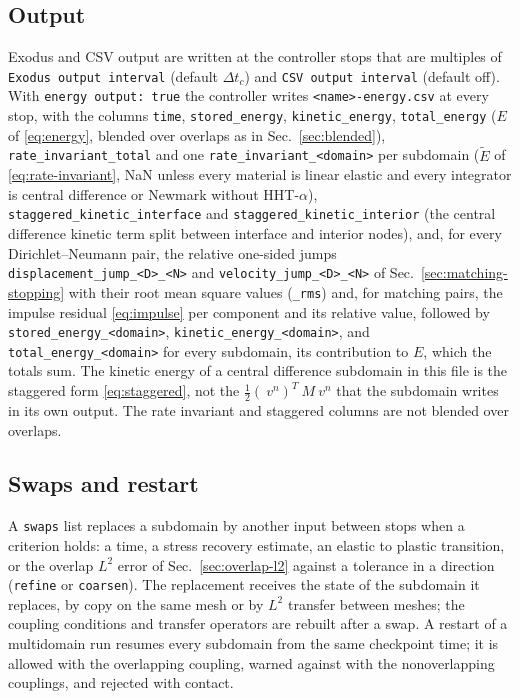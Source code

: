 \documentclass[11pt]{article}
\newcommand{\code}[1]{\texttt{#1}}
\begin{document}
\subsection{Output}
\label{sec:output}

Exodus and CSV output are written at the controller stops that are
multiples of \code{Exodus output interval} (default $\Delta t_c$) and
\code{CSV output interval} (default off). With
\code{energy output: true} the controller writes
\code{<name>-energy.csv} at every stop, with the columns \code{time},
\code{stored\_energy}, \code{kinetic\_energy}, \code{total\_energy}
($E$ of \eqref{eq:energy}, blended over overlaps as in
Sec.~\ref{sec:blended}), \code{rate\_invariant\_total} and one
\code{rate\_invariant\_<domain>} per subdomain ($\tilde{E}$ of
\eqref{eq:rate-invariant}, NaN unless every material is linear elastic and
every integrator is central difference or Newmark without HHT-$\alpha$),
\code{staggered\_kinetic\_interface} and
\code{staggered\_kinetic\_interior} (the central difference kinetic term
split between interface and interior nodes), and, for every
Dirichlet--Neumann pair, the relative one-sided jumps
\code{displacement\_jump\_<D>\_<N>} and \code{velocity\_jump\_<D>\_<N>}
of Sec.~\ref{sec:matching-stopping} with their root mean square values
(\code{\_rms}) and, for matching pairs, the impulse residual
\eqref{eq:impulse} per component and its relative value, followed by
\code{stored\_energy\_<domain>}, \code{kinetic\_energy\_<domain>},
and \code{total\_energy\_<domain>} for every subdomain, its contribution
to $E$, which the totals sum. The kinetic energy of a central difference
subdomain in this file is the staggered form \eqref{eq:staggered}, not the
$\tfrac12 (~v^n)^T ~M ~v^n$ that the subdomain writes in its own output. The
rate invariant and staggered columns are not blended over overlaps.

\subsection{Swaps and restart}
\label{sec:swaps}

A \code{swaps} list replaces a subdomain by another input between stops
when a criterion holds: a time, a stress recovery estimate, an elastic to
plastic transition, or the overlap $L^2$ error of Sec.~\ref{sec:overlap-l2}
against a tolerance in a direction (\code{refine} or \code{coarsen}). The
replacement receives the state of the subdomain it replaces, by copy on
the same mesh or by $L^2$ transfer between meshes; the coupling conditions
and transfer operators are rebuilt after a swap. A restart of a multidomain
run resumes every subdomain from the same checkpoint time; it is allowed
with the overlapping coupling, warned against with the nonoverlapping
couplings, and rejected with contact.
\end{document}
